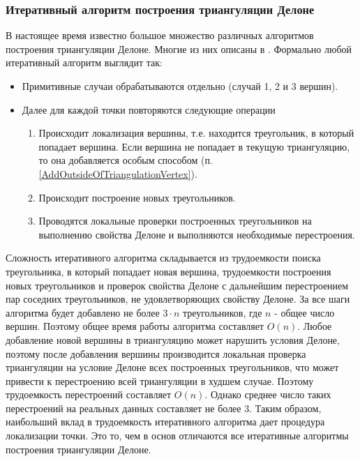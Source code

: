 \documentclass{fefu}
\begin{document}
\subsubsection{Итеративный алгоритм построения триангуляции Делоне}
В настоящее время известно большое множество различных алгоритмов построения триангуляции Делоне. Многие из них описаны
в \cite{Skvorcov}. Формально любой итеративный алгоритм выглядит так:
\begin{itemize}
    \item Примитивные случаи обрабатываются отдельно (случай 1, 2 и 3 вершин).
    \item Далее для каждой точки повторяются следующие операции
    \begin{enumerate}
        \item Происходит локализация вершины, т.е. находится треугольник, в который попадает вершина. Если вершина не попадает
        в текущую триангуляцию, то она добавляется особым способом (п. \ref{AddOutsideOfTriangulationVertex}).
        \item Происходит построение новых треугольников.
        \item Проводятся локальные проверки построенных треугольников на выполнению свойства Делоне и выполняются
        необходимые перестроения.
    \end{enumerate}
\end{itemize}
Сложность итеративного алгоритма складывается из трудоемкости поиска треугольника, в который попадает новая вершина,
трудоемкости построения новых треугольников и проверок свойства Делоне с дальнейшим перестроением пар соседних
треугольников, не удовлетворяющих свойству Делоне. За все шаги алгоритма будет добавлено не более $3 \cdot n$
треугольников, где $n$ - общее число вершин. Поэтому общее время работы алгоритма составляет $O(n)$. Любое добавление
новой вершины в триангуляцию может нарушить условия Делоне, поэтому после добавления вершины производится локальная
проверка триангуляции на условие Делоне всех построенных треугольников, что может привести к перестроению всей
триангуляции в худшем случае. Поэтому трудоемкость перестроений составляет $O(n)$. Однако среднее число таких перестроений
на реальных данных составляет не более 3\cite{Skvorcov2}. Таким образом, наибольший вклад в трудоемкость итеративного
алгоритма дает процедура локализации точки. Это то, чем в основ отличаются все итеративные алгоритмы построения
триангуляции Делоне.
\end{document}
